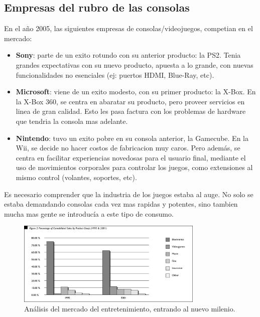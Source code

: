\documentclass[10pt,compsoc]{IEEEtran}
\begin{document}
	\subsection{Empresas del rubro de las consolas}
	\noindent 
	En el año 2005, las siguientes empresas de consolas/videojuegos, competian en el mercado: 
	\begin{itemize}
		\item{{\bf{Sony}}: parte de un exito rotundo con su anterior producto: la PS2. Tenia grandes expectativas con su nuevo producto, apuesta a lo grande, con nuevas funcionalidades no esenciales (ej: puertos HDMI, Blue-Ray, etc).}
		
		\item{{\bf{Microsoft}}: viene de un exito modesto, con su primer producto: la X-Box. En la X-Box 360, se centra en abaratar su producto, pero proveer servicios en linea de gran calidad. Esto les pasa factura con los problemas de hardware que tendria la consola mas adelante.}
		
		\item{{\bf{Nintendo}}: tuvo un exito pobre en su consola anterior, la Gamecube. En la Wii, se decide no hacer costos de fabricacion muy caros. Pero además, se centra en facilitar experiencias novedosas para el usuario final, mediante el uso de movimientos corporales para controlar los juegos, como extensiones al mismo control (volantes, soportes, etc).}
	\end{itemize}
	
	
	
	Es necesario comprender que la industria de los juegos estaba al auge. No solo se estaba demandando consolas cada vez mas rapidas y potentes, sino tambien mucha mas gente se introducía a este tipo de consumo.
	

	
	\begin{figure}[H]
	\centering
	\includegraphics[width=3.5in]{imgs/gamingshare.png}
	\caption{Análisis del mercado del entretenimiento, entrando al nuevo milenio.}
	\label{fig2}
	\end{figure}
	
\end{document}
